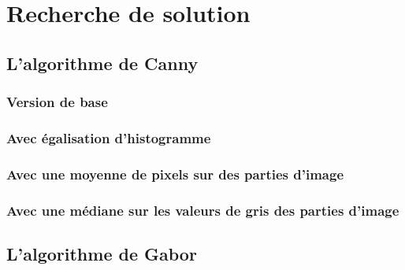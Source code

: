 \section{Recherche de solution}

\subsection{L'algorithme de Canny}

\subsubsection{Version de base}

\subsubsection{Avec égalisation d'histogramme}

\subsubsection{Avec une moyenne de pixels sur des parties d'image}

\subsubsection{Avec une médiane sur les valeurs de gris des parties d'image}

\subsection{L'algorithme de Gabor}
